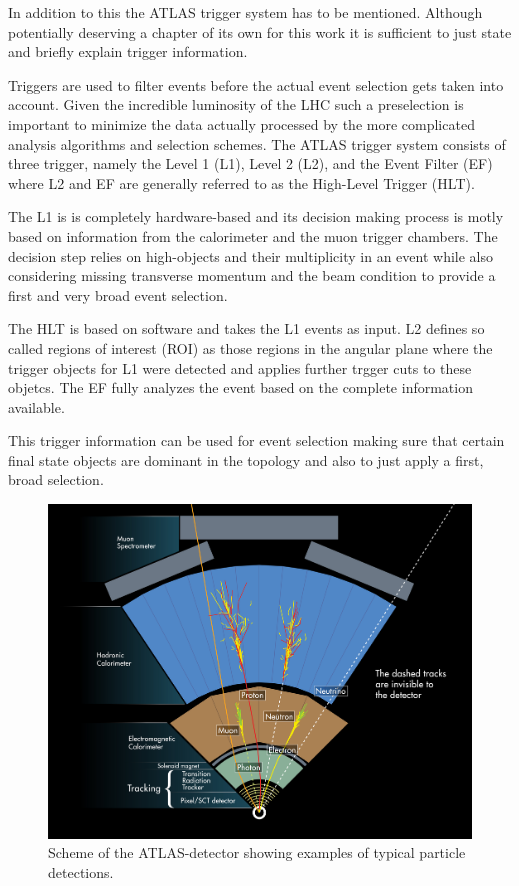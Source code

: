In addition to this the ATLAS trigger system has to be mentioned. Although potentially deserving a chapter of its own for this work it is sufficient to just state  and briefly explain trigger information.

Triggers are used to filter events before the actual event selection gets taken into account. Given the incredible luminosity of the LHC such a preselection is important to minimize the data actually processed by the more complicated analysis algorithms and selection schemes.
The ATLAS trigger system consists of three trigger, namely the Level 1 (L1), Level 2 (L2), and the Event Filter (EF) where L2 and EF are generally referred to as the High-Level Trigger (HLT).

The L1 is is completely hardware-based and its decision making process is motly based on information from the calorimeter and the muon trigger chambers. The decision step relies on high-\pT objects and their multiplicity in an event while also considering missing transverse momentum and the beam condition to provide a first and very broad event selection.

The HLT is based on software and takes the L1 events as input. L2 defines so called regions of interest (ROI) as those regions in the angular plane where the trigger objects for L1 were detected and applies further trgger cuts to these objetcs.
The EF fully analyzes the event based on the complete information available.

This trigger information can be used for event selection making sure that certain final state objects are dominant in the topology and also to just apply a first, broad selection.



\begin{figure}[htbp]
  \centering
  \includegraphics[scale=0.6]{figures_LHC/atlas-abstract}
  \caption[Scheme of the ATLAS-detector's detection procedure]{Scheme of the ATLAS-detector showing examples of typical particle detections. \cite{Pequenao:1095924}}
  \label{fig:atlas_sketch}
\end{figure}


